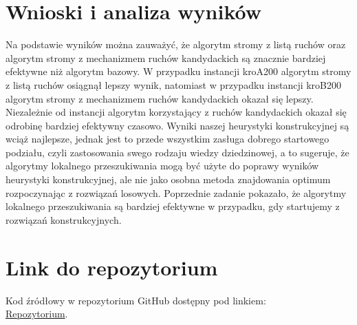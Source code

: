 \documentclass[11pt]{article}
\begin{document}
\section{Wnioski i analiza wyników}\label{sec:wnioski}

Na podstawie wyników można zauważyć, że algorytm stromy z listą ruchów oraz algorytm stromy z mechanizmem ruchów kandydackich są znacznie bardziej efektywne niż algorytm bazowy.
W przypadku instancji kroA200 algorytm stromy z listą ruchów osiągnął lepszy wynik, natomiast w przypadku instancji kroB200 algorytm stromy z mechanizmem ruchów kandydackich okazał się lepszy.
Niezależnie od instancji algorytm korzystający z ruchów kandydackich okazał się odrobinę bardziej efektywny czasowo.
Wyniki naszej heurystyki konstrukcyjnej są wciąż najlepsze, jednak jest to przede wszystkim zasługa dobrego startowego podziału, czyli zastosowania swego rodzaju wiedzy dziedzinowej,
a to sugeruje, że algorytmy lokalnego przeszukiwania mogą być użyte do poprawy wyników heurystyki konstrukcyjnej, ale nie jako osobna metoda znajdowania optimum rozpoczynając z rozwiązań losowych.
Poprzednie zadanie pokazało, że algorytmy lokalnego przeszukiwania są bardziej efektywne w przypadku, gdy startujemy z rozwiązań konstrukcyjnych.


\section{Link do repozytorium}\label{sec:link-do-repo}
Kod źródłowy w repozytorium GitHub dostępny pod linkiem: \\
\href{https://github.com/KotZPolibudy/PUT_IMO/tree/main/Lab3%20-%20Local_augmented}{Repozytorium}.
\end{document}

